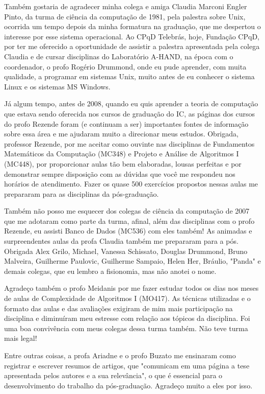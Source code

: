 Também gostaria de agradecer minha colega e amiga Claudia Marconi Engler Pinto, da turma de ciência da computação de 1981, pela palestra sobre Unix, ocorrida um tempo depois da minha formatura na graduação, que me despertou o interesse por esse sistema operacional. Ao CPqD Telebrás, hoje, Fundação CPqD, por ter me oferecido a oportunidade de assistir a palestra apresentada pela colega Claudia e de cursar disciplinas do Laboratório A-HAND, na época com o coordenador, o profo Rogério Drummond, onde eu pude aprender, com muita qualidade, a programar em sistemas Unix, muito antes de eu conhecer o sistema Linux e os sistemas MS Windows.

Já algum tempo, antes de 2008, quando eu quis aprender a teoria de computação que estava sendo oferecida nos cursos de graduação do IC, as páginas dos cursos do profo Rezende foram (e continuam a ser) importantes fontes de informação sobre essa área e me ajudaram muito a direcionar meus estudos. Obrigada, professor Rezende, por me aceitar como ouvinte nas disciplinas de Fundamentos Matemáticos da Computação (MC348) e Projeto e Análise de Algoritmos I (MC448), por proporcionar aulas tão bem elaboradas, lousas perfeitas e por demonstrar sempre disposição com as dúvidas que você me respondeu nos horários de atendimento. Fazer os quase 500 exercícios propostos nessas aulas me prepararam para as disciplinas da pós-graduação.

Também não posso me esquecer dos colegas de ciência da computação de 2007 que me adotaram como parte da turma, afinal, além das disciplinas com o profo Rezende, eu assisti Banco de Dados (MC536) com eles também! As animadas e surpreendentes aulas da profa Claudia também me prepararam para a pós. Obrigada Alex Grilo, Michael, Vanessa Schissato, Douglas Drummond, Bruno Malveira, Guilherme Paulovic, Guilherme Sampaio, Helen Her, Bráulio, "Panda" e demais colegas, que eu lembro a fisionomia, mas não anotei o nome.

Agradeço também o profo Meidanis por me fazer estudar todos os dias nos meses de aulas de Complexidade de Algoritmos I (MO417). As técnicas utilizadas e o formato das aulas e das avaliações exigiram de mim mais participação na disciplina e diminuíram meu estresse com relação aos tópicos da disciplina. Foi uma boa convivência com meus colegas dessa turma também. Não teve turma mais legal!

Entre outras coisas, a profa Ariadne e o profo Buzato me ensinaram como registrar e escrever resumos de artigos, que "comunicam em uma página a tese apresentada pelos autores e a sua relevância", o que é essencial para o desenvolvimento do trabalho da pós-graduação. Agradeço muito a eles por isso.

